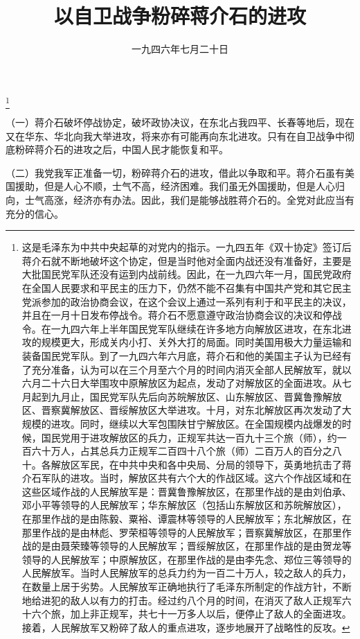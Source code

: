 
\title{以自卫战争粉碎蒋介石的进攻}
\date{一九四六年七月二十日}
\thanks{这是毛泽东为中共中央起草的对党内的指示。一九四五年《双十协定》签订后蒋介石就不断地破坏这个协定，但是当时他对全面内战还没有准备好，主要是大批国民党军队还没有运到内战前线。因此，在一九四六年一月，国民党政府在全国人民要求和平民主的压力下，仍然不能不召集有中国共产党和其它民主党派参加的政治协商会议，在这个会议上通过一系列有利于和平民主的决议，并且在一月十日发布停战令。蒋介石不愿意遵守政治协商会议的决议和停战令。在一九四六年上半年国民党军队继续在许多地方向解放区进攻，在东北进攻的规模更大，形成关内小打、关外大打的局面。同时美国用极大力量运输和装备国民党军队。到了一九四六年六月底，蒋介石和他的美国主子认为已经有了充分准备，认为可以在三个月至六个月的时间内消灭全部人民解放军，就以六月二十六日大举围攻中原解放区为起点，发动了对解放区的全面进攻。从七月起到九月止，国民党军队先后向苏皖解放区、山东解放区、晋冀鲁豫解放区、晋察冀解放区、晋绥解放区大举进攻。十月，对东北解放区再次发动了大规模的进攻。同时，继续以大军包围陕甘宁解放区。在全国规模内战爆发的时候，国民党用于进攻解放区的兵力，正规军共达一百九十三个旅（师），约一百六十万人，占其总兵力正规军二百四十八个旅（师）二百万人的百分之八十。各解放区军民，在中共中央和各中央局、分局的领导下，英勇地抗击了蒋介石军队的进攻。当时，解放区共有六个大的作战区域。这六个作战区域和在这些区域作战的人民解放军是：晋冀鲁豫解放区，在那里作战的是由刘伯承、邓小平等领导的人民解放军；华东解放区（包括山东解放区和苏皖解放区），在那里作战的是由陈毅、粟裕、谭震林等领导的人民解放军；东北解放区，在那里作战的是由林彪、罗荣桓等领导的人民解放军；晋察冀解放区，在那里作战的是由聂荣臻等领导的人民解放军；晋绥解放区，在那里作战的是由贺龙等领导的人民解放军；中原解放区，在那里作战的是由李先念、郑位三等领导的人民解放军。当时人民解放军的总兵力约为一百二十万人，较之敌人的兵力，在数量上居于劣势。人民解放军正确地执行了毛泽东所制定的作战方针，不断地给进犯的敌人以有力的打击。经过约八个月的时间，在消灭了敌人正规军六十六个旅，加上非正规军，共七十一万多人以后，便停止了敌人的全面进攻。接着，人民解放军又粉碎了敌人的重点进攻，逐步地展开了战略性的反攻。}
\maketitle


（一）蒋介石破坏停战协定，破坏政协决议，在东北占我四平、长春等地后，现在又在华东、华北向我大举进攻，将来亦有可能再向东北进攻。只有在自卫战争中彻底粉碎蒋介石的进攻之后，中国人民才能恢复和平。

（二）我党我军正准备一切，粉碎蒋介石的进攻，借此以争取和平。蒋介石虽有美国援助，但是人心不顺，士气不高，经济困难。我们虽无外国援助，但是人心归向，士气高涨，经济亦有办法。因此，我们是能够战胜蒋介石的。全党对此应当有充分的信心。

